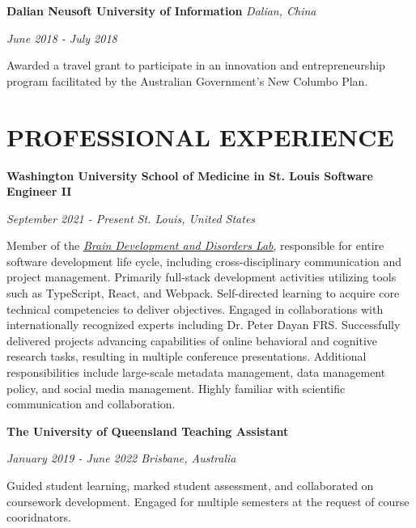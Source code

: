 \documentclass{article}
\begin{document}
  \medbreak

  \textbf{Dalian Neusoft University of Information} \hfill \textit{Dalian, China}

  \textit{June 2018 - July 2018}

  Awarded a travel grant to participate in an innovation and entrepreneurship program facilitated by the Australian Government's New Columbo Plan.

  \section*{\centering\uppercase{Professional Experience}}

  {\large\textbf{Washington University School of Medicine in St. Louis \hfill Software Engineer II}}

  \textit{September 2021 - Present \hfill St. Louis, United States}

  Member of the \href{https://sites.wustl.edu/richardslab/}{\color{blue}\underline{\textit{Brain Development and Disorders Lab}}}, responsible for entire software development life cycle, including cross-disciplinary communication and project management.
  Primarily full-stack development activities utilizing tools such as TypeScript, React, and Webpack.
  Self-directed learning to acquire core technical competencies to deliver objectives.
  Engaged in collaborations with internationally recognized experts including Dr. Peter Dayan {\small{FRS}}.
  Successfully delivered projects advancing capabilities of online behavioral and cognitive research tasks, resulting in multiple conference presentations.
  Additional responsibilities include large-scale metadata management, data management policy, and social media management.
  Highly familiar with scientific communication and collaboration.

  \medbreak

  {\large\textbf{The University of Queensland \hfill Teaching Assistant}}

  \textit{January 2019 - June 2022 \hfill Brisbane, Australia}

  Guided student learning, marked student assessment, and collaborated on coursework development. Engaged for multiple semesters at the request of course cooridnators.
\end{document}
